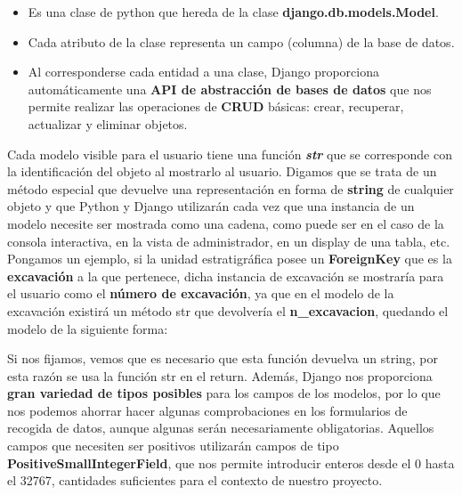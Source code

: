         \begin{itemize}
            \item Es una clase de python que hereda de la clase \textbf{django.db.models.Model}.
            \item Cada atributo de la clase representa un campo (columna) de la base de datos.
            \item Al corresponderse cada entidad a una clase, Django proporciona automáticamente
            una \textbf{API de abstracción de bases de datos} que nos permite realizar las
            operaciones de \textbf{CRUD} básicas: crear, recuperar, actualizar y eliminar
            objetos.
        \end{itemize}

    Cada modelo visible para el usuario tiene una función \textbf{\textit{str}} que se
    corresponde con la identificación del objeto al mostrarlo al usuario. Digamos que se
    trata de un método especial que devuelve una representación en forma de \textbf{string} de
    cualquier objeto y que Python y Django utilizarán cada vez que una instancia de un 
    modelo necesite ser mostrada como una cadena, como puede ser en el caso de la consola
    interactiva, en la vista de administrador, en un display de una tabla, etc.\\

    Pongamos un ejemplo, si la unidad estratigráfica posee un \textbf{ForeignKey} que es
    la \textbf{excavación} a la que pertenece, dicha instancia de excavación se mostraría
    para el usuario como el \textbf{número de excavación}, ya que en el modelo de la
    excavación existirá un método str que devolvería el \textbf{n\_excavacion},
    quedando el modelo de la siguiente forma:



    Si nos fijamos, vemos que es necesario que esta función devuelva un string, por esta
    razón se usa la función str en el return. Además, Django nos proporciona \textbf{gran
    variedad de tipos posibles} para los campos de los modelos, por lo que nos podemos
    ahorrar hacer algunas comprobaciones en los formularios de recogida de datos, aunque
    algunas serán necesariamente obligatorias. Aquellos campos que necesiten ser positivos
    utilizarán campos de tipo \textbf{PositiveSmallIntegerField}, que nos permite introducir
    enteros desde el 0 hasta el 32767, cantidades suficientes para el contexto de nuestro
    proyecto.\\

